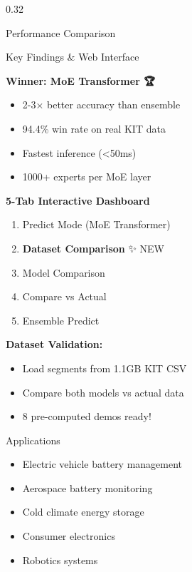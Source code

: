 \documentclass[final]{beamer}
\begin{document}
\begin{frame}[t]
\begin{columns}[t]
\begin{column}{0.32\textwidth}
\begin{block}{Performance Comparison}
\end{block}

\vspace{1cm}

\begin{block}{Key Findings \& Web Interface}

\textbf{Winner: MoE Transformer 🏆}

\begin{itemize}
\item 2-3× better accuracy than ensemble
\item 94.4\% win rate on real KIT data
\item Fastest inference (<50ms)
\item 1000+ experts per MoE layer
\end{itemize}

\vspace{0.5cm}

\textbf{5-Tab Interactive Dashboard}

\begin{enumerate}
\item Predict Mode (MoE Transformer)
\item \textbf{Dataset Comparison} ✨ NEW
\item Model Comparison
\item Compare vs Actual
\item Ensemble Predict
\end{enumerate}

\textbf{Dataset Validation:}
\begin{itemize}
\item Load segments from 1.1GB KIT CSV
\item Compare both models vs actual data
\item 8 pre-computed demos ready!
\end{itemize}

\end{block}

\vspace{1cm}

\begin{block}{Applications}

\begin{itemize}
\item Electric vehicle battery management
\item Aerospace battery monitoring
\item Cold climate energy storage
\item Consumer electronics
\item Robotics systems
\end{itemize}


\end{block}
\end{column}
\end{columns}
\end{frame}
\end{document}
